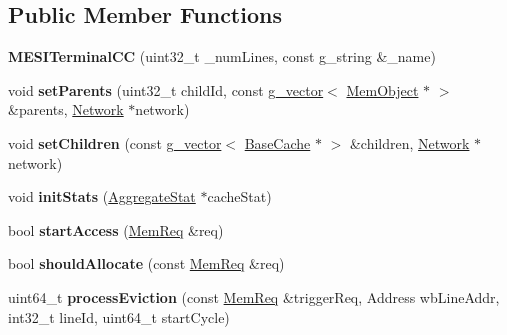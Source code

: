 \subsection*{Public Member Functions}
\begin{DoxyCompactItemize}
\item 
\hypertarget{classMESITerminalCC_a0d93783e167a6bca644354f77e60d1fe}{{\bfseries M\-E\-S\-I\-Terminal\-C\-C} (uint32\-\_\-t \-\_\-num\-Lines, const g\-\_\-string \&\-\_\-name)}\label{classMESITerminalCC_a0d93783e167a6bca644354f77e60d1fe}

\item 
\hypertarget{classMESITerminalCC_a230fc2239f2acf8f6e57786f8750483e}{void {\bfseries set\-Parents} (uint32\-\_\-t child\-Id, const \hyperlink{classg__vector}{g\-\_\-vector}$<$ \hyperlink{classMemObject}{Mem\-Object} $\ast$ $>$ \&parents, \hyperlink{classNetwork}{Network} $\ast$network)}\label{classMESITerminalCC_a230fc2239f2acf8f6e57786f8750483e}

\item 
\hypertarget{classMESITerminalCC_a2bbbc4214ffadd1115a67dbd49ee50ab}{void {\bfseries set\-Children} (const \hyperlink{classg__vector}{g\-\_\-vector}$<$ \hyperlink{classBaseCache}{Base\-Cache} $\ast$ $>$ \&children, \hyperlink{classNetwork}{Network} $\ast$network)}\label{classMESITerminalCC_a2bbbc4214ffadd1115a67dbd49ee50ab}

\item 
\hypertarget{classMESITerminalCC_a1ee7f811161cb4951b6c1b35e79e9402}{void {\bfseries init\-Stats} (\hyperlink{classAggregateStat}{Aggregate\-Stat} $\ast$cache\-Stat)}\label{classMESITerminalCC_a1ee7f811161cb4951b6c1b35e79e9402}

\item 
\hypertarget{classMESITerminalCC_a5b9506a6b60ad1f23ff23bd3ed1343c7}{bool {\bfseries start\-Access} (\hyperlink{structMemReq}{Mem\-Req} \&req)}\label{classMESITerminalCC_a5b9506a6b60ad1f23ff23bd3ed1343c7}

\item 
\hypertarget{classMESITerminalCC_a42f3aa120a60de090a2483938561d07c}{bool {\bfseries should\-Allocate} (const \hyperlink{structMemReq}{Mem\-Req} \&req)}\label{classMESITerminalCC_a42f3aa120a60de090a2483938561d07c}

\item 
\hypertarget{classMESITerminalCC_ae5589835876a10a06e49e1f9c2d54381}{uint64\-\_\-t {\bfseries process\-Eviction} (const \hyperlink{structMemReq}{Mem\-Req} \&trigger\-Req, Address wb\-Line\-Addr, int32\-\_\-t line\-Id, uint64\-\_\-t start\-Cycle)}\label{classMESITerminalCC_ae5589835876a10a06e49e1f9c2d54381}


\end{DoxyCompactItemize}
